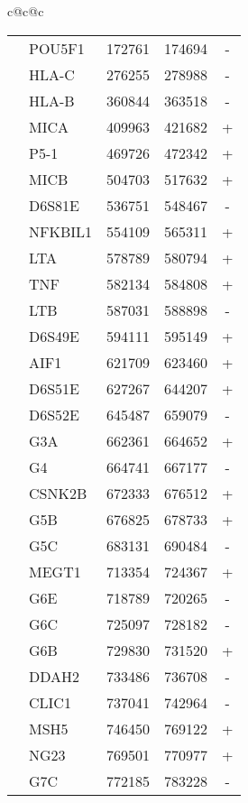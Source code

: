 \begin{tabular}{c@{\quad}c@{\quad}c}
\begin{tabular}[t]{|r|lrrc|}
         & POU5F1     &   172761 &   174694 & - \\
         & HLA-C      &   276255 &   278988 & - \\
         & HLA-B      &   360844 &   363518 & - \\
         & MICA       &   409963 &   421682 & + \\
         & P5-1       &   469726 &   472342 & + \\
         & MICB       &   504703 &   517632 & + \\
         & D6S81E     &   536751 &   548467 & - \\
         & NFKBIL1    &   554109 &   565311 & + \\
         & LTA        &   578789 &   580794 & + \\
         & TNF        &   582134 &   584808 & + \\
         & LTB        &   587031 &   588898 & - \\
         & D6S49E     &   594111 &   595149 & + \\
         & AIF1       &   621709 &   623460 & + \\
         & D6S51E     &   627267 &   644207 & + \\
         & D6S52E     &   645487 &   659079 & - \\
         & G3A        &   662361 &   664652 & + \\
         & G4         &   664741 &   667177 & - \\
         & CSNK2B     &   672333 &   676512 & + \\
         & G5B        &   676825 &   678733 & + \\
         & G5C        &   683131 &   690484 & - \\
         & MEGT1      &   713354 &   724367 & + \\
         & G6E        &   718789 &   720265 & - \\
         & G6C        &   725097 &   728182 & - \\
         & G6B        &   729830 &   731520 & + \\
         & DDAH2      &   733486 &   736708 & - \\
         & CLIC1      &   737041 &   742964 & - \\
         & MSH5       &   746450 &   769122 & + \\
         & NG23       &   769501 &   770977 & + \\
         & G7C        &   772185 &   783228 & - \\

\end{tabular}
\end{tabular}
